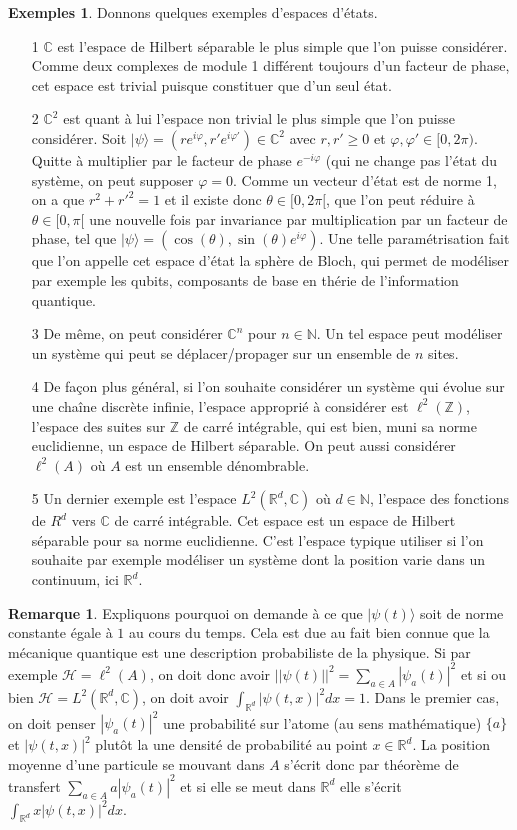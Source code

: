 \documentclass[12pt,openany,a4paper, titlepage]{article}
\newcommand{\lp}{\left(}
\newcommand{\rp}{\right)}
\newcommand{\R}{\mathbb{R}}
\newcommand{\C}{\mathbb{C}}
\newcommand{\Z}{\mathbb{Z}}
\newcommand{\N}{\mathbb{N}}
\newcommand{\HH}{\mathcal{H}}
\newcommand{\vp}{\varphi}
\theoremstyle{definition}
\theoremstyle{definition}
\theoremstyle{definition}
\theoremstyle{definition}
\newtheorem{exs}{Exemples}
\theoremstyle{definition}
\newtheorem{rem}{Remarque}
\theoremstyle{definition}
\begin{document}
\begin{exs}
    Donnons quelques exemples d'espaces d'états.
    \begin{enumerate}
        \item[1] $\C$ est l'espace de Hilbert séparable le plus simple que l'on puisse considérer. Comme deux complexes de module 1 différent toujours d'un facteur de phase, cet espace est trivial puisque constituer que d'un seul état.
        \item[2] $\C^2$ est quant à lui l'espace non trivial le plus simple que l'on puisse considérer. Soit $|\psi\rangle = (re^{i\vp}, r'e^{i\vp'}) \in \C^2$ avec $r,r'\geq 0$ et $\vp, \vp' \in [0,2\pi)$. Quitte à multiplier par le facteur de phase $e^{-i\vp}$ (qui ne change pas l'état du système, on peut supposer $\vp = 0$. Comme un vecteur d'état est de norme 1, on a que $r^2 + r'^2 = 1$ et il existe donc $\theta \in [0,2\pi[$, que l'on peut réduire à $\theta \in [0,\pi[$ une nouvelle fois par invariance par multiplication par un facteur de phase, tel que $|\psi\rangle = \lp \cos(\theta), \sin(\theta)e^{i\vp}\rp$. Une telle paramétrisation fait que l'on appelle cet espace d'état la sphère de Bloch, qui permet de modéliser par exemple les qubits, composants de base en thérie de l'information quantique.
        \item[3] De même, on peut considérer $\C^n$ pour $n\in\N$. Un tel espace peut modéliser un système qui peut se déplacer/propager sur un ensemble de $n$ sites.
        \item[4]  De façon plus général, si l'on souhaite considérer un système qui évolue sur une chaîne discrète infinie, l'espace approprié à considérer est $\ell^2(\Z)$, l'espace des suites sur $\Z$ de carré intégrable, qui est bien, muni sa norme euclidienne, un espace de Hilbert séparable. On peut aussi considérer $\ell^2(A)$ où $A$ est un ensemble dénombrable.
        \item[5] Un dernier exemple est l'espace $L^2(\R^d,\C)$ où $d\in\N$, l'espace des fonctions de $R^d$ vers $\C$ de carré intégrable. Cet espace est un espace de Hilbert séparable pour sa norme euclidienne. C'est l'espace typique utiliser si l'on souhaite par exemple modéliser un système dont la position varie dans un continuum, ici $\R^d$.
    \end{enumerate}
\end{exs}

\begin{rem}
    Expliquons pourquoi on demande à ce que $|\psi(t)\rangle$ soit de norme constante égale à $1$ au cours du temps. Cela est due au fait bien connue que la mécanique quantique est une description probabiliste de la physique. Si par exemple $\HH = \ell^2(A)$, on doit donc avoir $||\psi(t)||^2 = \sum_{a\in A} |\psi_a(t)|^2$ et si ou bien $\HH = L^2(\R^d,\C)$, on doit avoir $\int_{\R^d}|\psi(t,x)|^2dx = 1$. Dans le premier cas, on doit penser $|\psi_a(t)|^2$ une probabilité sur l'atome (au sens mathématique) $\{a\}$ et $|\psi(t,x)|^2$ plutôt la une densité de probabilité au point $x \in \R^d$. La position moyenne d'une particule se mouvant dans $A$ s'écrit donc par théorème de transfert $\sum_{a\in A} a|\psi_a(t)|^2$ et si elle se meut dans $\R^d$ elle s'écrit $\int_{\R^d}x|\psi(t,x)|^2dx$.
\end{rem}
\end{document}
